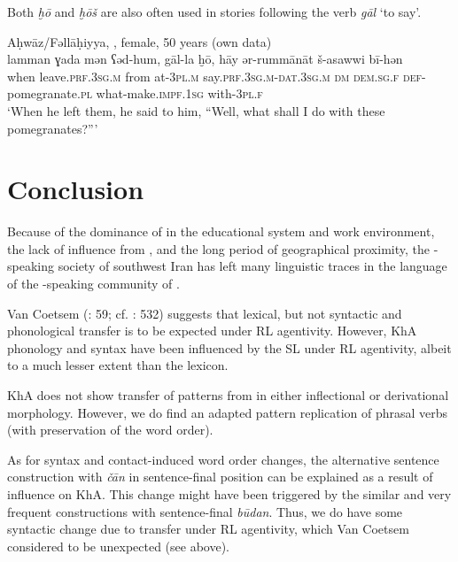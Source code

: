 \documentclass[output=paper,nonflat]{langsci/langscibook}
\begin{document}

Both \textit{ḫō} and \textit{ḫōš} are also often used in stories following the verb \textit{gāl} ‘to say’.

\ea
{Aḥwāz/Fəllāḥiyya, , female, 50 years (own data)}\\
\gll lamman ɣada mən ʕəd-hum, gāl-la ḫō, hāy ər-rummānāt š-asawwi bī-hən\\
     when leave.\textsc{prf}.\textsc{3sg.m} from at-\textsc{3pl.m} say.\textsc{prf}.\textsc{3sg.m}-\textsc{dat.3sg.m} \textsc{dm} \textsc{dem}.\textsc{sg}.\textsc{f} \textsc{def}-pomegranate.\textsc{pl} what-make.\textsc{impf}.\textsc{1sg} with-\textsc{3pl.f}\\
\glt ‘When he left them, he said to him, ``Well, what shall I do with these pomegranates?”’
\z

\section{Conclusion}

Because of the dominance of  in the  educational system and work environment, the lack of influence from  , and the long period of geographical proximity, the -speaking society of southwest Iran has left many linguistic traces in the language of the -speaking community of . 

Van Coetsem (\citeyear{VanCoetsem2000}: 59; cf. \citealt{Lucas2015}: 532) suggests that lexical, but not syntactic and phonological {transfer} is to be expected under {RL} agentivity. However, KhA phonology and syntax have been influenced by the {SL}  under {RL} agentivity, albeit to a much lesser extent than the lexicon.

KhA does not show {transfer} of patterns from  in either {inflectional} or {derivational} morphology. However, we do find an adapted pattern {replication} of  phrasal verbs (with preservation of the  {word order}). 

As for syntax and contact-induced {word order} changes, the alternative sentence construction with \textit{čān} in sentence-final position can be explained as a result of  influence on KhA. This change might have been triggered by the similar and very frequent  constructions with sentence-final \textit{būdan}. Thus, we do have some syntactic change due to {transfer} under {RL} agentivity, which Van Coetsem considered to be unexpected (see above).
\end{document}
